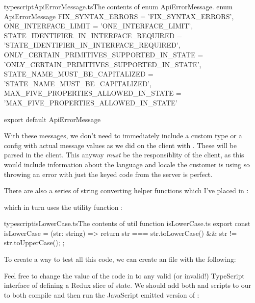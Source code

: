 \documentclass[paper=6in:9in,pagesize=pdftex,headinclude=on,footinclude=on,12pt,twoside]{scrbook}
\begin{document}
\begin{codeInput}{typescript}{ApiErrorMessage.ts}{The contents of enum ApiErrorMessage.}
  enum ApiErrorMessage {
    FIX_SYNTAX_ERRORS = 'FIX_SYNTAX_ERRORS',
    ONE_INTERFACE_LIMIT = 'ONE_INTERFACE_LIMIT',
    STATE_IDENTIFIER_IN_INTERFACE_REQUIRED = 'STATE_IDENTIFIER_IN_INTERFACE_REQUIRED',
    ONLY_CERTAIN_PRIMITIVES_SUPPORTED_IN_STATE = 'ONLY_CERTAIN_PRIMITIVES_SUPPORTED_IN_STATE',
    STATE_NAME_MUST_BE_CAPITALIZED = 'STATE_NAME_MUST_BE_CAPITALIZED',
    MAX_FIVE_PROPERTIES_ALLOWED_IN_STATE = 'MAX_FIVE_PROPERTIES_ALLOWED_IN_STATE'
}

export default ApiErrorMessage
\end{codeInput}

With these messages, we don't need to immediately include a custom type or a config with actual message values as we did on the client with . These  will be parsed in the client. This anyway \textit{must} be the responsiblity of the client, as this would include information about the language and locale the customer is using so throwing an error with just the keyed code from the server is perfect.

There are also a series of string converting helper functions which I've placed in :


which in turn uses the utility function :

\begin{codeInput}{typescript}{isLowerCase.ts}{The contents of util function isLowerCase.ts}
export const isLowerCase = (str: string) => {
  return str === str.toLowerCase() && str != str.toUpperCase();
};  
\end{codeInput}


To create a way to test all this code, we can create an  file with the following:


Feel free to change the value of the code in  to any valid (or invalid!) TypeScript interface of defining a Redux slice of state. We should add both  and  scripts to our  to both compile and then run the JavaScript emitted version of :
\end{document}
